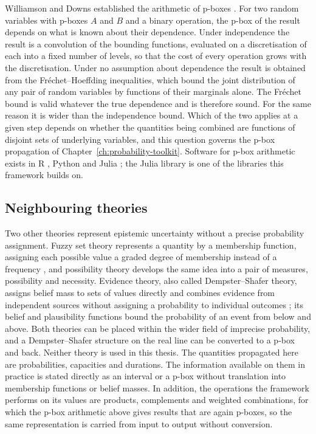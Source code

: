\documentclass[12pt]{report}
\begin{document}
Williamson and Downs established the arithmetic of p-boxes \cite{williamson1990probabilistic}.
For two random variables with p-boxes $A$ and $B$ and a binary operation, the p-box of the
result depends on what is known about their dependence. Under independence the result is a convolution of the bounding functions, evaluated on a
discretisation of each into a fixed number of levels, so that the cost of every operation
grows with the discretisation. Under no assumption about dependence the result is obtained
from the Fr\'{e}chet--Hoeffding inequalities, which bound the joint distribution of any pair of
random variables by functions of their marginals alone. The Fr\'{e}chet bound is valid whatever the true dependence and is therefore sound. For the
same reason it is wider than the independence bound. Which of the two applies at a given step depends on whether the quantities
being combined are functions of disjoint sets of underlying variables, and this question
governs the p-box propagation of Chapter~\ref{ch:probability-toolkit}. Software for p-box
arithmetic exists in R \cite{ferson2019pbar}, Python \cite{gray2022pba} and Julia
\cite{gray2021pbajulia}; the Julia library is one of the libraries this framework builds on.

\subsection{Neighbouring theories}
\label{sec:bg-other-theories}

Two other theories represent epistemic uncertainty without a precise probability assignment.
Fuzzy set theory represents a quantity by a membership function, assigning each possible value
a graded degree of membership instead of a frequency \cite{zadeh1965fuzzy}, and possibility
theory develops the same idea into a pair of measures, possibility and necessity. Evidence
theory, also called Dempster--Shafer theory, assigns belief mass to sets of values directly and
combines evidence from independent sources without assigning a probability to individual
outcomes \cite{shafer1976mathematical}; its belief and plausibility functions bound the
probability of an event from below and above. Both theories can be placed within the wider
field of imprecise probability, and a Dempster--Shafer structure on the real line can be
converted to a p-box and back. Neither theory is used in this thesis. The
quantities propagated here are probabilities, capacities and durations. The information
available on them in practice is stated directly as an interval or a p-box without
translation into membership functions or belief masses. In addition, the operations the framework performs on
its values are products, complements and weighted combinations, for which the p-box arithmetic
above gives results that are again p-boxes, so the same representation is carried from input to
output without conversion.
\end{document}
